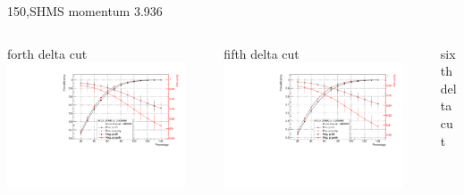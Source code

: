 \documentclass[aspectratio=169,xcolor=dvipsnames]{beamer}
\begin{document}
\begin{frame}{150,SHMS momentum 3.936}
\begin{columns}
\begin{column}[T]{0.3\textwidth}
\end{column}
\end{columns}
\begin{columns}
\begin{column}[T]{0.3\textwidth}
forth delta cut \\
\includegraphics[width = 0.9\textwidth]{results/pid/SHMS_rf_150_3.pdf}
\end{column}
\begin{column}[T]{0.3\textwidth}
fifth delta cut \\
\includegraphics[width = 0.9\textwidth]{results/pid/SHMS_rf_150_4.pdf}
\end{column}
\begin{column}[T]{0.3\textwidth}
sixth delta cut \\

\end{column}
\end{columns}
\end{frame}
\end{document}
